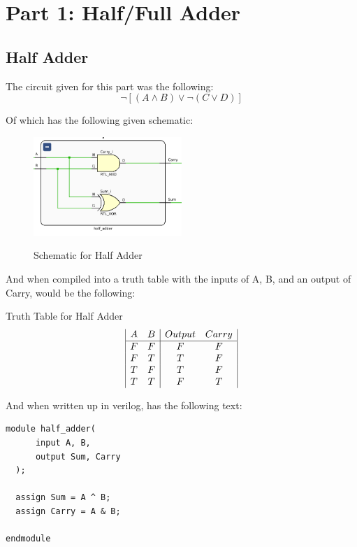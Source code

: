 \section{Part 1: Half/Full Adder}
\subsection{Half Adder}
The circuit given for this part was the following:
$$ \neg[(A \land B) \lor \neg (C \lor D)] $$

Of which has the following given schematic:
\begin{figure}[!htbp]
    \centering
    \caption{Schematic for Half Adder}
    \includegraphics[width=0.5\textwidth]{part-1-half-schem.png}
    \label{Half Adder Schematic}
\end{figure}

And when compiled into a truth table with the inputs of A, B, and an output of Carry, would be the following:
\begin{center}
    Truth Table for Half Adder
    \begin{displaymath}
    \begin{array}{|c c|c c|}
      A & B & Output & Carry\\
    \hline
    F & F & F & F \\
    F & T & T & F \\
    T & F & T & F \\
    T & T & F & T \\
    \end{array}
    \end{displaymath}
\end{center}
\newpage
And when written up in verilog, has the following text:
\begin{lstlisting}[label={label}, style=Verilog]
module half_adder(
      input A, B,
      output Sum, Carry
  );
  
  assign Sum = A ^ B;
  assign Carry = A & B;
  
endmodule
\end{lstlisting}


